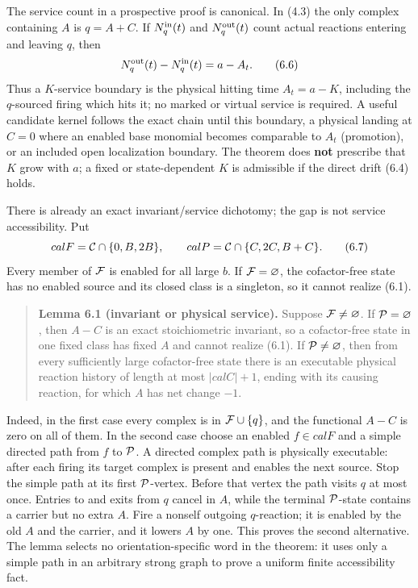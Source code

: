The service count in a prospective proof is canonical. In (4.3) the only
complex containing \(A\) is \(q=A+C\). If \(N_q^{\rm in}(t)\) and
\(N_q^{\rm out}(t)\) count actual reactions entering and leaving \(q\),
then \[
 N_q^{\rm out}(t)-N_q^{\rm in}(t)=a-A_t.                     \tag{6.6}
\] Thus a \(K\)-service boundary is the physical hitting time
\(A_t=a-K\), including the \(q\)-sourced firing which hits it; no marked
or virtual service is required. A useful candidate kernel follows the
exact chain until this boundary, a physical landing at \(C=0\) where an
enabled base monomial becomes comparable to \(A_t\) (promotion), or an
included open localization boundary. The theorem does \textbf{not}
prescribe that \(K\) grow with \(a\); a fixed or state-dependent \(K\)
is admissible if the direct drift (6.4) holds.

There is already an exact invariant/service dichotomy; the gap is not
service accessibility. Put \[
 {cal F}={\cal C}\cap\{0,B,2B\},\qquad
 {cal P}={\cal C}\cap\{C,2C,B+C\}.                           \tag{6.7}
\] Every member of \({\cal F}\) is enabled for all large \(b\). If
\({\cal F}=\varnothing\), the cofactor-free state has no enabled source
and its closed class is a singleton, so it cannot realize (6.1).

\begin{quote}
\textbf{Lemma 6.1 (invariant or physical service).} Suppose
\({\cal F}\ne\varnothing\). If \({\cal P}=\varnothing\), then \(A-C\) is
an exact stoichiometric invariant, so a cofactor-free state in one fixed
class has fixed \(A\) and cannot realize (6.1). If
\({\cal P}\ne\varnothing\), then from every sufficiently large
cofactor-free state there is an executable physical reaction history of
length at most \(|{cal C}|+1\), ending with its causing reaction, for
which \(A\) has net change \(-1\).
\end{quote}

Indeed, in the first case every complex is in \({\cal F}\cup\{q\}\), and
the functional \(A-C\) is zero on all of them. In the second case choose
an enabled \(f\in{cal F}\) and a simple directed path from \(f\) to
\({\cal P}\). A directed complex path is physically executable: after
each firing its target complex is present and enables the next source.
Stop the simple path at its first \({\cal P}\)-vertex. Before that
vertex the path visits \(q\) at most once. Entries to and exits from
\(q\) cancel in \(A\), while the terminal \({\cal P}\)-state contains a
carrier but no extra \(A\). Fire a nonself outgoing \(q\)-reaction; it
is enabled by the old \(A\) and the carrier, and it lowers \(A\) by one.
This proves the second alternative. The lemma selects no
orientation-specific word in the theorem: it uses only a simple path in
an arbitrary strong graph to prove a uniform finite accessibility fact.

